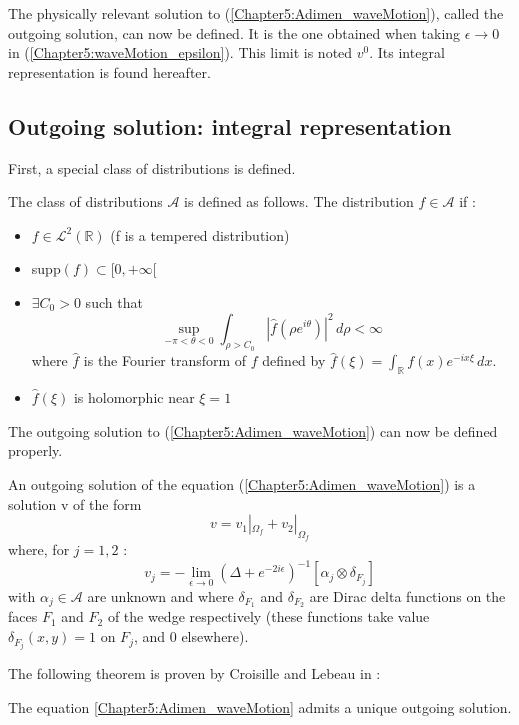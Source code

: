 The physically relevant solution to (\ref{Chapter5:Adimen_waveMotion}), called the outgoing solution, can now be defined. It is the one obtained when taking $\epsilon \to 0$ in (\ref{Chapter5:waveMotion_epsilon}). This limit is noted $v^0$. Its integral representation is found hereafter.

\subsection*{Outgoing solution: integral representation}
\label{integral_representation}

First, a special class of distributions is defined.
\begin{definition}
The class of distributions $\mathcal{A}$ is defined as follows. The distribution $f\in \mathcal{A}$ if :
\begin{itemize}
\item $f \in \mathcal{L}^2(\mathbb{R})$ (f is a tempered distribution)
\item supp$(f) \subset \lbrack 0,+\infty \lbrack$
\item $\exists C_0>0$ such that
$$ \sup_{-\pi<\theta<0} \int_{\rho>C_0}|\hat{f}(\rho e^{i\theta})|^2\,d\rho <\infty$$
where $\hat{f}$ is the Fourier transform of $f$ defined by $\hat{f}(\xi)=\int_{\mathbb{R}}f(x)e^{-ix\xi}\, dx$.
\item $\hat{f}(\xi)$ is holomorphic near $\xi=1$
\end{itemize}

\end{definition}
The outgoing solution to (\ref{Chapter5:Adimen_waveMotion}) can now be defined properly.

\begin{definition}
An outgoing solution of the equation (\ref{Chapter5:Adimen_waveMotion}) is a solution v of the form 
\begin{equation}
\label{Chapter5:decomposition}
v=v_1|_{\Omega_f}+v_2|_{\Omega_f}
\end{equation}
where, for $j=1,2$ :
\begin{equation}
\label{inv_potentiels}
v_j=-\lim_{\epsilon \to 0} \left(\Delta+e^{-2i\epsilon}\right)^{-1} \left[ \alpha_j \otimes \delta_{F_j} \right]
\end{equation}
with $\alpha_j \in \mathcal{A}$ are unknown and where $\delta_{F_1}$ and $\delta_{F_2}$ are Dirac delta functions on the faces $F_1$ and $F_2$ of the wedge respectively (these functions take value $\delta_{F_j}(x,y)=1$ on $F_j$, and 0 elsewhere).

\end{definition}
The following theorem is proven by Croisille and Lebeau in \cite{CroisilleLebeau} :
\begin{theorem}
The equation \eqref{Chapter5:Adimen_waveMotion} admits a unique outgoing solution.
\end{theorem}

